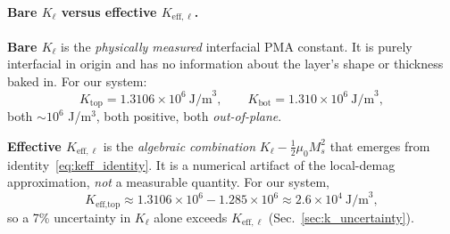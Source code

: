 \documentclass[11pt,a4paper]{article}
\newcommand{\Ms}{M_s}
\begin{document}
\paragraph{Bare $K_\ell$ versus effective $K_{\text{eff},\ell}$.}
\textbf{Bare $K_\ell$} is the \emph{physically measured}
interfacial PMA constant.  It is purely interfacial in
origin and has no information about the layer's shape or
thickness baked in.  For our system:
%
\begin{equation*}
K_{\text{top}} = 1.3106\times 10^6\ \text{J/m}^3,\qquad
K_{\text{bot}} = 1.310\times 10^6\ \text{J/m}^3,
\end{equation*}
%
both $\sim 10^6$ J/m$^3$, both positive, both
\emph{out-of-plane}.

\textbf{Effective $K_{\text{eff},\ell}$} is the
\emph{algebraic combination}
$K_\ell - \tfrac{1}{2}\mu_0 \Ms^2$ that emerges from
identity~\eqref{eq:keff_identity}.  It is a numerical
artifact of the local-demag approximation, \emph{not} a
measurable quantity.  For our system,
%
\begin{equation*}
K_{\text{eff,top}} \approx 1.3106\times 10^6
- 1.285\times 10^6
\approx 2.6\times 10^4\ \text{J/m}^3 ,
\end{equation*}
%
so a 7\% uncertainty in $K_\ell$ alone exceeds $K_{\text{eff},\ell}$
(Sec.~\ref{sec:k_uncertainty}).
\end{document}
